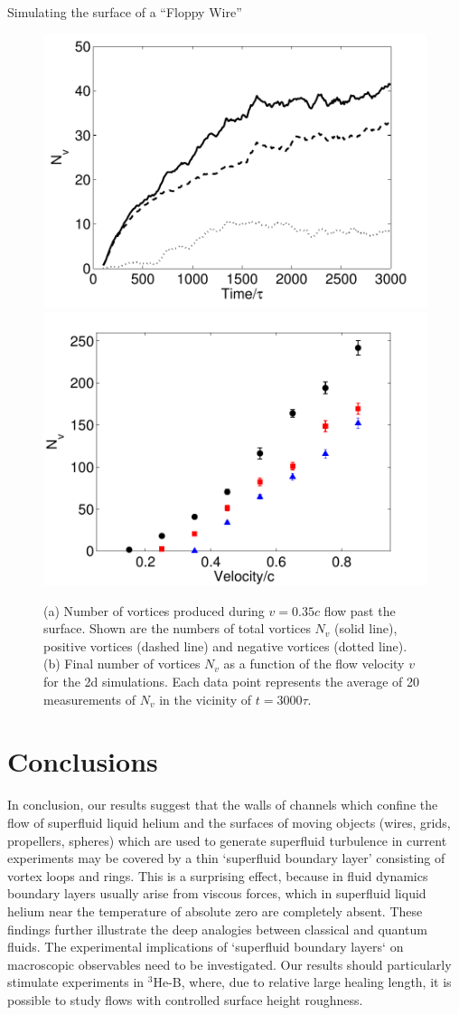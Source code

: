 \begin{chapter}{\label{cha:afm}Simulating the surface of a ``Floppy Wire''}
\begin{figure}
\centering
\includegraphics[width=0.45\linewidth]{./afm/figures/nvpn3bw}
\includegraphics[width=0.45\linewidth]{./afm/figures/nv_v}
\caption{\label{fig:nvort} (a) Number of vortices produced during $v=0.35c$ flow past the surface.  Shown are the numbers of total vortices $N_v$ (solid line), positive vortices (dashed line) and negative vortices (dotted line). (b) Final number of vortices $N_v$ as a function of the flow velocity $v$ for the 2d simulations.  Each data point represents the average of 20 measurements of $N_v$ in the vicinity of $t=3000\tau$.}
\end{figure}  

\section{Conclusions}
In conclusion, our results suggest that the walls of channels which
confine the flow of superfluid liquid helium and the surfaces of moving
objects (wires, grids, propellers, spheres) which are used
to generate superfluid turbulence in current experiments
may be covered by a thin `superfluid boundary layer' consisting of 
vortex loops and rings.  This is a surprising effect, because
in fluid dynamics boundary layers usually arise from viscous forces, 
which in superfluid liquid helium near the temperature of
absolute zero are completely absent.  These findings further illustrate the deep analogies between classical and quantum fluids.
The experimental implications of `superfluid boundary layers` on macroscopic
observables need to be investigated.  Our results should
particularly stimulate experiments in $^3$He-B, where, due to relative
large healing length, it is possible to study flows with controlled 
surface height roughness. 

\end{chapter}
